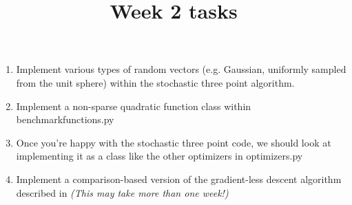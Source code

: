 \documentclass[12pt]{article}
\title{Week 2 tasks}
\begin{document}
\maketitle

\begin{enumerate}
	\item Implement various types of random vectors (e.g. Gaussian, uniformly sampled from the unit sphere) within the stochastic three point algorithm. \\
	\item Implement a non-sparse quadratic function class within benchmarkfunctions.py \\
	\item Once you're happy with the stochastic three point code, we should look at implementing it as a class like the other optimizers in optimizers.py \\
	\item Implement a comparison-based version of the gradient-less descent algorithm described in \cite{golovin2019gradientless} {\em (This may take more than one week!)}

\end{enumerate}



\end{document}
